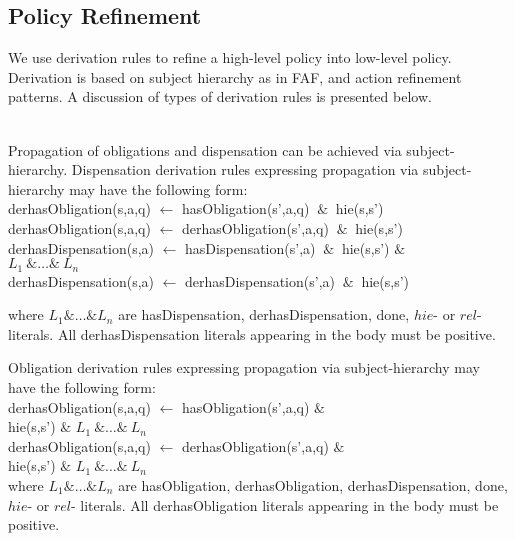 \documentclass[12pt,journal,letterpaper,onecolumn]{IEEEtran}
\begin{document}
\subsection{Policy Refinement}

We use derivation rules to refine a high-level policy into low-level
policy. Derivation is based on subject hierarchy as in FAF, and
action refinement patterns. A discussion of types of derivation rules
is presented below.

\\
Propagation of obligations and dispensation can be achieved via
subject-hierarchy. Dispensation derivation rules expressing
propagation via subject-hierarchy may have the following form:\\
{\ttfamily derhasObligation(s,a,q) $\leftarrow$
hasObligation(s',a,q) $~\&~$ hie(s,s')} \\
{\ttfamily derhasObligation(s,a,q) $\leftarrow$
derhasObligation(s',a,q) $~\&~$ hie(s,s')} \\
{\ttfamily derhasDispensation(s,a) $\leftarrow$
hasDispensation(s',a) $~\&~$ hie(s,s')  $\&$ \\
\indent\indent\indent\indent    $L_1~ \&\ldots\&~ L_n$} \\
{\ttfamily derhasDispensation(s,a) $\leftarrow$
derhasDispensation(s',a) $~\&~$ hie(s,s')}


where $L_1\&\ldots\&L_n$ are {\ttfamily hasDispensation,
derhasDispensation, done}, $hie$- or $rel$- literals. All {\ttfamily
derhasDispensation} literals appearing in the body must be
positive.

Obligation derivation rules expressing
propagation via subject-hierarchy may have the  following form:\\
{\ttfamily derhasObligation(s,a,q) $\leftarrow$
hasObligation(s',a,q) $\&$ \\
\indent \indent \indent \indent \indent \indent \indent \indent
\indent\indent hie(s,s') $\&$ $L_1~ \&\ldots\&~ L_n$} \\
{\ttfamily derhasObligation(s,a,q) $\leftarrow$
derhasObligation(s',a,q) $\&$ \\
\indent \indent \indent \indent \indent \indent \indent \indent
\indent\indent hie(s,s') $\&$ $L_1~ \&\ldots\&~ L_n$} \\
where $L_1\&\ldots\&L_n$ are {\ttfamily hasObligation,
derhasObligation, derhasDispensation, done}, $hie$- or $rel$-
literals. All {\ttfamily derhasObligation} literals appearing in the
body must be positive.
\end{document}
